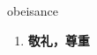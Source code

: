 
\begin{frame}
{\huge obeisance}
\begin{center}
\begin{enumerate}\Large
  \item \textbf{敬礼，尊重}
\end{enumerate}
\end{center}
\end{frame}
